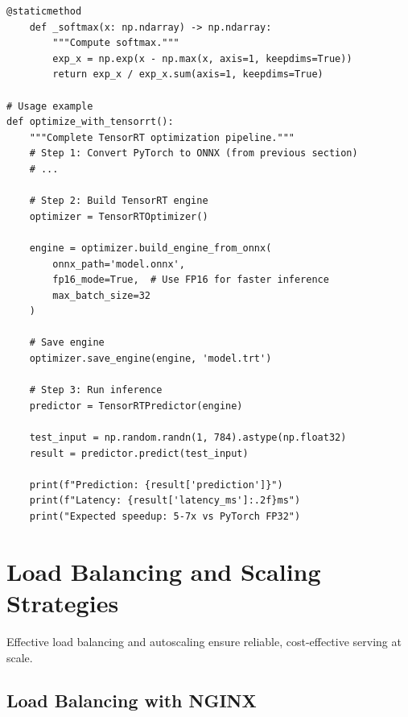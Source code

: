 \begin{lstlisting}[style=python, caption=TensorRT optimization for NVIDIA GPUs]
    @staticmethod
    def _softmax(x: np.ndarray) -> np.ndarray:
        """Compute softmax."""
        exp_x = np.exp(x - np.max(x, axis=1, keepdims=True))
        return exp_x / exp_x.sum(axis=1, keepdims=True)

# Usage example
def optimize_with_tensorrt():
    """Complete TensorRT optimization pipeline."""
    # Step 1: Convert PyTorch to ONNX (from previous section)
    # ...

    # Step 2: Build TensorRT engine
    optimizer = TensorRTOptimizer()

    engine = optimizer.build_engine_from_onnx(
        onnx_path='model.onnx',
        fp16_mode=True,  # Use FP16 for faster inference
        max_batch_size=32
    )

    # Save engine
    optimizer.save_engine(engine, 'model.trt')

    # Step 3: Run inference
    predictor = TensorRTPredictor(engine)

    test_input = np.random.randn(1, 784).astype(np.float32)
    result = predictor.predict(test_input)

    print(f"Prediction: {result['prediction']}")
    print(f"Latency: {result['latency_ms']:.2f}ms")
    print("Expected speedup: 5-7x vs PyTorch FP32")
\end{lstlisting}

\section{Load Balancing and Scaling Strategies}

Effective load balancing and autoscaling ensure reliable, cost-effective serving at scale.

\subsection{Load Balancing with NGINX}


